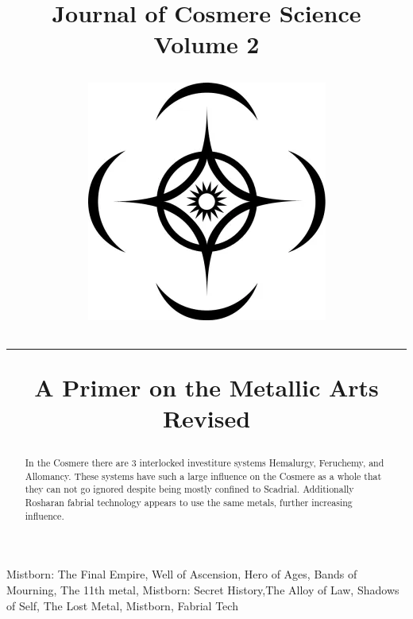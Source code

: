 \documentclass[conference]{IEEEtran}
\newcommand{\n}{\hfill\break}
\begin{document}
\makeatletter
\newlength{\logoheight}
\setlength{\logoheight}{50pt} %

    

\title{\parbox[c]{.75\linewidth}{{\selectfont\Huge{\textbf{Journal of Cosmere Science}}\\\huge{Volume 2}}}%
    \hfill%
    \raisebox{\dimexpr-.5\logoheight+.5ex\relax}%
    {\includegraphics[height=\logoheight]{images/cosmere_symbol.png}}\par%
    \vspace{15pt}%
    
    \hrule
    \n
    \textbf{A Primer on the Metallic Arts Revised}}

\author{
}

\maketitle

\begin{abstract}
In the Cosmere there are 3 interlocked investiture systems Hemalurgy, Feruchemy, and Allomancy.  These systems have such a large influence on the Cosmere as a whole that they can not go ignored despite being mostly confined to Scadrial.  Additionally Rosharan fabrial technology appears to use the same metals, further increasing influence.
\end{abstract}

\begin{IEEEkeywords}
 Mistborn: The Final Empire, Well of Ascension, Hero of Ages, Bands of Mourning, The 11th metal, Mistborn: Secret History,The Alloy of Law, Shadows of Self, The Lost Metal, Mistborn, Fabrial Tech
\end{IEEEkeywords}
\n
\end{document}
